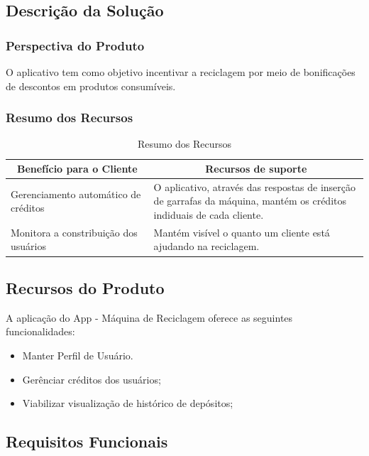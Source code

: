 \subsection{Descrição da Solução}

\subsubsection{Perspectiva do Produto}
O aplicativo tem como objetivo incentivar a reciclagem por meio de bonificações de descontos em produtos consumíveis.

\subsubsection{Resumo dos Recursos}
\begin{table}[htp]
    \centering
    \caption{Resumo dos Recursos}
    \label{my-label}
    \begin{tabular}{|p{0.40\linewidth}|p{0.60\linewidth}|}
        \hline
        \multicolumn{1}{|c|}{\textbf{Benefício para o Cliente}} & \multicolumn{1}{c|}{\textbf{Recursos de suporte}} \\ \hline
        Gerenciamento automático de créditos    & O aplicativo, através das respostas de inserção de garrafas da máquina, mantém os créditos indiduais de cada cliente. \\ \hline
        Monitora a constribuição dos usuários    & Mantém visível o quanto um cliente está ajudando na reciclagem. \\ \hline
    \end{tabular}
\end{table}

\subsection{Recursos do Produto}
A aplicação do App - Máquina de Reciclagem oferece as seguintes funcionalidades:

\begin{itemize}
    \item Manter Perfil de Usuário.
    \item Gerênciar créditos dos usuários;
    \item Viabilizar visualização de histórico de depósitos;
\end{itemize}

\subsection{Requisitos Funcionais}


